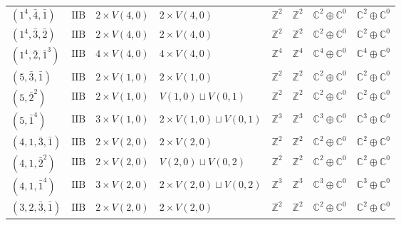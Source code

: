 \documentclass[11pt,a4paper]{article}
\begin{document}
\begin{appendix}
\begin{table}
\begin{tabular}{C{2.65cm}C{0.85cm}C{3.0cm}C{3.0cm}C{2.25cm}C{2.25cm}C{1.55cm}C{1.55cm}}
\((1^{4}, \bar{4}, \bar{1})\) & \(\mathrm{IIB}\) & \(2 \times V(4,0)\) & \(2 \times V(4,0)\) & \(\mathbb{Z}^{2}\) & \(\mathbb{Z}^{2}\) & \(\mathbb{C}^{2} \oplus \mathbb{C}^{0}\) & \(\mathbb{C}^{2} \oplus \mathbb{C}^{0}\) \\
\((1^{4}, \bar{3}, \bar{2})\) & \(\mathrm{IIB}\) & \(2 \times V(4,0)\) & \(2 \times V(4,0)\) & \(\mathbb{Z}^{2}\) & \(\mathbb{Z}^{2}\) & \(\mathbb{C}^{2} \oplus \mathbb{C}^{0}\) & \(\mathbb{C}^{2} \oplus \mathbb{C}^{0}\) \\
\((1^{4}, \bar{2}, \bar{1}^{3})\) & \(\mathrm{IIB}\) & \(4 \times V(4,0)\) & \(4 \times V(4,0)\) & \(\mathbb{Z}^{4}\) & \(\mathbb{Z}^{4}\) & \(\mathbb{C}^{4} \oplus \mathbb{C}^{0}\) & \(\mathbb{C}^{4} \oplus \mathbb{C}^{0}\) \\
\((5, \bar{3}, \bar{1})\) & \(\mathrm{IIB}\) & \(2 \times V(1,0)\) & \(2 \times V(1,0)\) & \(\mathbb{Z}^{2}\) & \(\mathbb{Z}^{2}\) & \(\mathbb{C}^{2} \oplus \mathbb{C}^{0}\) & \(\mathbb{C}^{2} \oplus \mathbb{C}^{0}\) \\
\((5, \bar{2}^{2})\) & \(\mathrm{IIB}\) & \(2 \times V(1,0)\) & \(V(1,0) \sqcup V(0,1)\) & \(\mathbb{Z}^{2}\) & \(\mathbb{Z}^{2}\) & \(\mathbb{C}^{2} \oplus \mathbb{C}^{0}\) & \(\mathbb{C}^{2} \oplus \mathbb{C}^{0}\) \\
\((5, \bar{1}^{4})\) & \(\mathrm{IIB}\) & \(3 \times V(1,0)\) & \(2 \times V(1,0) \sqcup V(0,1)\) & \(\mathbb{Z}^{3}\) & \(\mathbb{Z}^{3}\) & \(\mathbb{C}^{3} \oplus \mathbb{C}^{0}\) & \(\mathbb{C}^{3} \oplus \mathbb{C}^{0}\) \\
\((4, 1, \bar{3}, \bar{1})\) & \(\mathrm{IIB}\) & \(2 \times V(2,0)\) & \(2 \times V(2,0)\) & \(\mathbb{Z}^{2}\) & \(\mathbb{Z}^{2}\) & \(\mathbb{C}^{2} \oplus \mathbb{C}^{0}\) & \(\mathbb{C}^{2} \oplus \mathbb{C}^{0}\) \\
\((4, 1, \bar{2}^{2})\) & \(\mathrm{IIB}\) & \(2 \times V(2,0)\) & \(V(2,0) \sqcup V(0,2)\) & \(\mathbb{Z}^{2}\) & \(\mathbb{Z}^{2}\) & \(\mathbb{C}^{2} \oplus \mathbb{C}^{0}\) & \(\mathbb{C}^{2} \oplus \mathbb{C}^{0}\) \\
\((4, 1, \bar{1}^{4})\) & \(\mathrm{IIB}\) & \(3 \times V(2,0)\) & \(2 \times V(2,0) \sqcup V(0,2)\) & \(\mathbb{Z}^{3}\) & \(\mathbb{Z}^{3}\) & \(\mathbb{C}^{3} \oplus \mathbb{C}^{0}\) & \(\mathbb{C}^{3} \oplus \mathbb{C}^{0}\) \\
\((3, 2, \bar{3}, \bar{1})\) & \(\mathrm{IIB}\) & \(2 \times V(2,0)\) & \(2 \times V(2,0)\) & \(\mathbb{Z}^{2}\) & \(\mathbb{Z}^{2}\) & \(\mathbb{C}^{2} \oplus \mathbb{C}^{0}\) & \(\mathbb{C}^{2} \oplus \mathbb{C}^{0}\) \\

\end{tabular}
\end{table}
\end{appendix}
\end{document}
